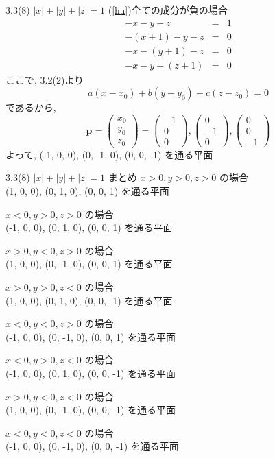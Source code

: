 \documentclass{beamer}
\begin{document}
\begin{frame}{3.3(8) $|x| + |y| + |z|  = 1$ \hspace{5mm} (\ref{hu})全ての成分が負の場合}
  \begin{eqnarray*}
    -x - y - z &=& 1\\
    -(x+1) - y - z &=& 0\\
    -x - (y+1) - z &=& 0\\
    -x - y - (z+1) &=& 0
  \end{eqnarray*}
  ここで, 3.2(2)より
  \begin{equation*}
    a(x-x_0) + b(y-y_0) + c(z-z_0) = 0
  \end{equation*}
  であるから,
  \begin{equation*}
    \bm{p} = 
    \begin{pmatrix}
      x_0\\
      y_0\\
      z_0
    \end{pmatrix} =
    \begin{pmatrix}
      -1\\
      0\\
      0
    \end{pmatrix} , 
    \begin{pmatrix}
      0\\
      -1\\
      0
    \end{pmatrix} , 
    \begin{pmatrix}
      0\\
      0\\
      -1
    \end{pmatrix} 
  \end{equation*}
  よって, (-1, 0, 0), (0, -1, 0), (0, 0, -1) を通る平面
\end{frame}

\begin{frame}{3.3(8) $|x| + |y| + |z|  = 1$ \hspace{5mm} まとめ}
  $x > 0, y > 0, z > 0$ の場合 \\
  (1, 0, 0), (0, 1, 0), (0, 0, 1) を通る平面
  
  $x < 0, y > 0, z > 0$ の場合 \\
  (-1, 0, 0), (0, 1, 0), (0, 0, 1) を通る平面
  
  $x > 0, y < 0, z > 0$ の場合 \\
  (1, 0, 0), (0, -1, 0), (0, 0, 1) を通る平面

  $x > 0, y > 0, z < 0$ の場合 \\
  (1, 0, 0), (0, 1, 0), (0, 0, -1) を通る平面

  $x < 0, y < 0, z > 0$ の場合 \\
  (-1, 0, 0), (0, -1, 0), (0, 0, 1) を通る平面
  
  $x < 0, y > 0, z < 0$ の場合 \\
  (-1, 0, 0), (0, 1, 0), (0, 0, -1) を通る平面

  $x > 0, y < 0, z < 0$ の場合 \\
  (1, 0, 0), (0, -1, 0), (0, 0, -1) を通る平面
  
  $x < 0, y < 0, z < 0$ の場合 \\
  (-1, 0, 0), (0, -1, 0), (0, 0, -1) を通る平面
\end{frame}
\end{document}
